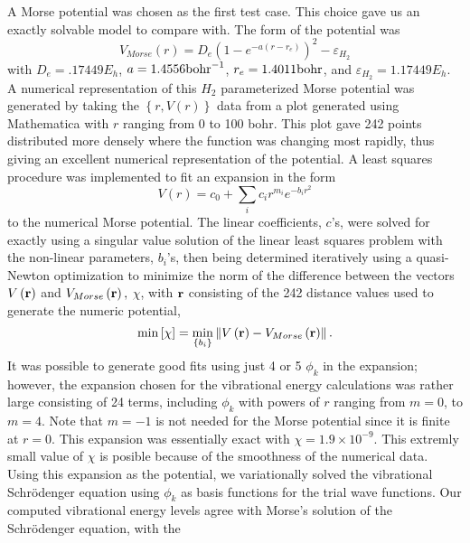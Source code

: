 A Morse potential was chosen as the first test case. This choice gave us an
exactly solvable model to compare with. The form of the potential was 
\begin{equation}
V_{Morse}\left( r\right) =D_e\left( 1-e^{-a\left( r-r_e\right) }\right)
^2-\varepsilon _{H_2}
\end{equation}
with $D_e=.17449E_h$, $a=1.4556{\rm bohr}^{-1}$, $r_e=1.4011{\rm bohr}$, and 
$\varepsilon _{H_2}=1.17449E_h.$ A numerical representation of this $H_2$
parameterized Morse potential was generated by taking the $\left\{ r,V\left(
r\right) \right\} $ data from a plot generated using Mathematica\cite
{Mathematica} with $r$ ranging from 0 to 100 bohr. This plot gave 242 points
distributed more densely where the function was changing most rapidly, thus
giving an excellent numerical representation of the potential. A least
squares procedure was implemented to fit an expansion in the form 
\begin{equation}
V\left( r\right) =c_0+\sum_ic_ir^{m_i}e^{-b_ir^2}
\end{equation}
to the numerical Morse potential. The linear coefficients, $c$'s, were
solved for exactly using a singular value solution of the linear least
squares problem with the non-linear parameters, $b_i$'s, then being
determined iteratively using a quasi-Newton optimization to minimize the
norm of the difference between the vectors $V\left( {\bf r}\right) $ and $%
V_{Morse}\left( {\bf r}\right) ,$ $\chi $, with ${\bf r}$ consisting of the
242 distance values used to generate the numeric potential, 
\begin{equation}
\min \left[ \chi \right] =\min_{\left\{ b_i\right\} }\left\| V\left( {\bf r}%
\right) -V_{Morse}\left( {\bf r}\right) \right\| .
\end{equation}
It was possible to generate good fits using just 4 or 5 $\phi _k$ in the
expansion; however, the expansion chosen for the vibrational energy
calculations was rather large consisting of 24 terms, including $\phi _k$
with powers of $r$ ranging from $m=0$, to $m=4$. Note that $m=-1$ is not
needed for the Morse potential since it is finite at $r=0$. This expansion
was essentially exact with $\chi =1.9\times 10^{-9}$. This extremly small
value of $\chi $ is posible because of the smoothness of the numerical data.
Using this expansion as the potential, we variationally solved the
vibrational Schr\"{o}denger equation using $\phi _k$ as basis functions for
the trial wave functions. Our computed vibrational energy levels agree with
Morse's solution of the Schr\"{o}denger equation\cite{Morse29}, with the
